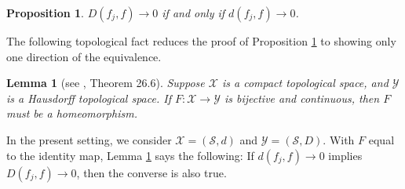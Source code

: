 \documentclass[11pt,reqno]{amsart}
\numberwithin{equation}{section}
\newtheorem{prop}[thm]{Proposition}
\newtheorem{lemma}[thm]{Lemma}
\theoremstyle{definition}
\begin{document}
\begin{prop} \label{equal_topologies}
$D(f_j,f) \to 0$ if and only if $d(f_j,f) \to 0$.
\end{prop}

The following topological fact reduces the proof of Proposition \ref{equal_topologies} to showing only one direction of the equivalence.

\begin{lemma}[see \cite{munkres00}, Theorem 26.6] \label{topology_fact}
Suppose ${\mathcal{X}}$ is a compact topological space, and ${\mathcal{Y}}$ is a Hausdorff topological space. 
If $F : {\mathcal{X}} \to {\mathcal{Y}}$ is bijective and continuous, then $F$ must be a homeomorphism.
\end{lemma}

In the present setting, we consider ${\mathcal{X}} = ({\mathcal{S}},d)$ and ${\mathcal{Y}} = ({\mathcal{S}},D)$.
With $F$ equal to the identity map, Lemma \ref{topology_fact} says the following: If $d(f_j,f) \to 0$ implies $D(f_j,f) \to 0$, then the converse is also true.
\end{document}
